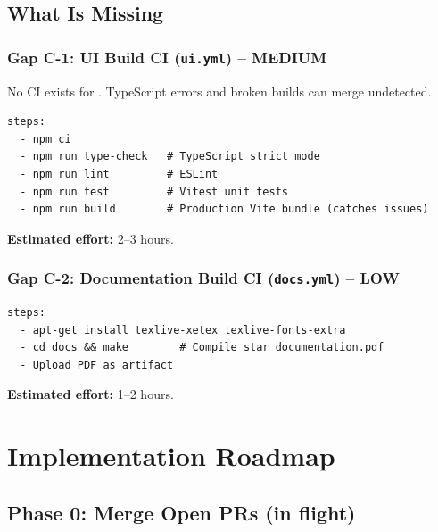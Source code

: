 \documentclass[12pt,a4paper]{article}
\newcommand{\filepath}[1]{\textcolor{dirgreen}{\texttt{\seqsplit{#1}}}}
\begin{document}
\subsection{What Is Missing}

\subsubsection{Gap C-1: UI Build CI (\texttt{ui.yml}) -- MEDIUM}

\begin{warnbox}
  No CI exists for \filepath{star-ui/}. TypeScript errors and broken builds can merge undetected.
\end{warnbox}

\begin{lstlisting}[caption={Required steps for ui.yml}]
steps:
  - npm ci
  - npm run type-check   # TypeScript strict mode
  - npm run lint         # ESLint
  - npm run test         # Vitest unit tests
  - npm run build        # Production Vite bundle (catches issues)
\end{lstlisting}

\textbf{Estimated effort:} 2--3 hours.

\subsubsection{Gap C-2: Documentation Build CI (\texttt{docs.yml}) -- LOW}

\begin{lstlisting}[caption={Required steps for docs.yml}]
steps:
  - apt-get install texlive-xetex texlive-fonts-extra
  - cd docs && make        # Compile star_documentation.pdf
  - Upload PDF as artifact
\end{lstlisting}

\textbf{Estimated effort:} 1--2 hours.

\newpage

\section{Implementation Roadmap}

\subsection{Phase 0: Merge Open PRs (in flight)}
\end{document}

